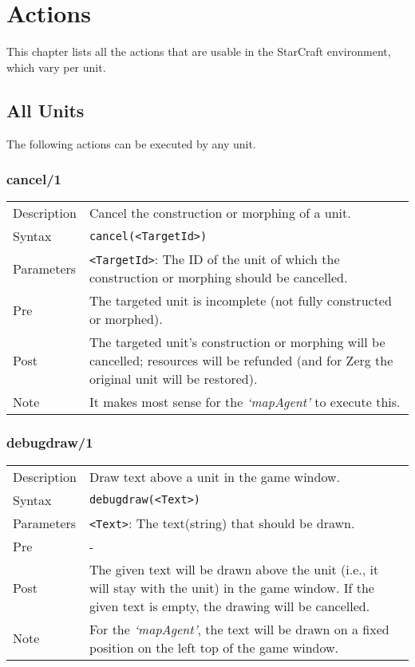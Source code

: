 \chapter{Actions}

This chapter lists all the actions that are usable in the StarCraft environment, which vary per unit.

\section{All Units}
The following actions can be executed by any unit.

\subsection{cancel/1}
\begin{tabularx}{\textwidth}{lX}
 Description & Cancel the construction or morphing of a unit. \\
 Syntax & \verb|cancel(<TargetId>)| \\
 Parameters & \verb|<TargetId>|: The ID of the unit of which the construction or morphing should be cancelled. \\
 Pre & The targeted unit is incomplete (not fully constructed or morphed). \\
 Post & The targeted unit's construction or morphing will be cancelled; resources will be refunded (and for Zerg the original unit will be restored). \\
 Note & It makes most sense for the \textit{`mapAgent'} to execute this.
\end{tabularx}

\subsection{debugdraw/1}
\begin{tabularx}{\textwidth}{lX}
 Description & Draw text above a unit in the game window. \\
 Syntax & \verb|debugdraw(<Text>)| \\
 Parameters & \verb|<Text>|: The text(string) that should be drawn. \\
 Pre & - \\
 Post & The given text will be drawn above the unit (i.e., it will stay with the unit) in the game window. If the given text is empty, the drawing will be cancelled. \\
 Note & For the \textit{`mapAgent'}, the text will be drawn on a fixed position on the left top of the game window.
\end{tabularx}

